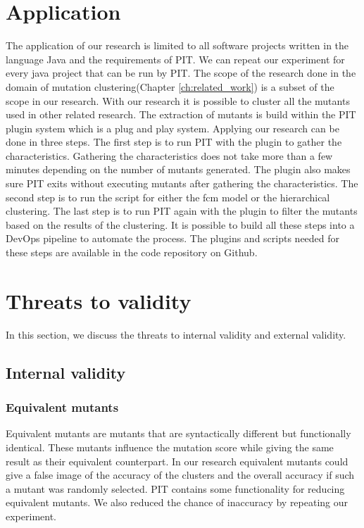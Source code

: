 \documentclass[../main]{subfiles}
\begin{document}
\section{Application}
The application of our research is limited to all software projects written in the language Java and the requirements of PIT\cite{pit}.
We can repeat our experiment for every java project that can be run by PIT.
The scope of the research done in the domain of mutation clustering(Chapter \ref{ch:related_work}) is a subset of the scope in our research.
With our research it is possible to cluster all the mutants used in other related research.
The extraction of mutants is build within the PIT plugin system which is a plug and play system.
Applying our research can be done in three steps.
The first step is to run PIT with the plugin to gather the characteristics.
Gathering the characteristics does not take more than a few minutes depending on the number of mutants generated.
The plugin also makes sure PIT exits without executing mutants after gathering the characteristics.
The second step is to run the script for either the \acrshort{fcm} model or the hierarchical clustering.
The last step is to run PIT again with the plugin to filter the mutants based on the results of the clustering.
It is possible to build all these steps into a DevOps pipeline to automate the process. 
The plugins and scripts needed for these steps are available in the code repository on Github\cite{rbasarat-repo}.

\section{Threats to validity}
In this section, we discuss the threats to internal validity and external validity.
\subsection{Internal validity}
\subsubsection{Equivalent mutants}
Equivalent mutants are mutants that are syntactically different but functionally identical.
These mutants influence the mutation score while giving the same result as their equivalent counterpart.
In our research equivalent mutants could give a false image of the accuracy of the clusters and the overall accuracy if such a mutant was randomly selected.
PIT contains some functionality for reducing equivalent mutants\cite{pit}.
We also reduced the chance of inaccuracy by repeating our experiment.
\end{document}
